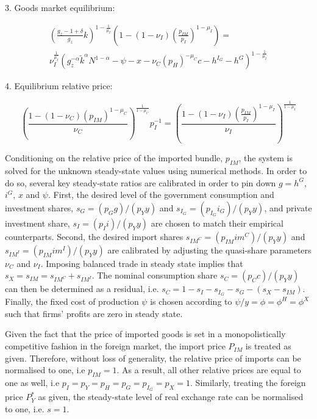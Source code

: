 \documentclass[a4paper,11pt]{article}
\numberwithin{equation}{section}
\begin{document}
	3. Goods market equilibrium:
	
	\begin{multline} \label{ss_goods_final}
	\left(\frac{g_z-1+\delta}{g_z}k\right)^{1-\frac{1}{\mu_I}}\left(1-\left(1-\nu_I\right)\left(\frac{p_{IM}}{p_I}\right)^{1-\mu_I}\right)=\\
	\nu_I^{\frac{1}{\mu_I}}\left(g_z^{-\alpha}\tilde{k}^{\alpha}N^{1-\alpha}-\psi-x-\nu_C\left(p_H\right)^{-\mu_C}c-h^{I_G}-h^G\right)^{1-\frac{1}{\mu_I}}
	\end{multline}
	
	4. Equilibrium relative price:
	
	\begin{equation}
	\left(\frac{1-\left(1-\nu_C\right)\left(p_{IM}\right)^{1-\mu_C}}{\nu_C}\right)^{\frac{1}{1-\mu_C}}p_I^{-1}=\left(\frac{1-\left(1-\nu_I\right)\left(\frac{p_{IM}}{p_I}\right)^{1-\mu_I}}{\nu_I}\right)^{\frac{1}{1-\mu_I}}
	\end{equation}
	
	Conditioning on the relative price of the imported bundle, $p_{IM}$, the system is solved for the unknown steady-state values using numerical methods. In order to do so, several key steady-state ratios are calibrated in order to pin down $g=h^G$, $i^G$, $x$ and $\psi$. First, the desired level of the government consumption and investment shares, $s_G=(p_Gg)/(p_Yy)$ and $s_{I_G}=(p_{I_G}i_G)/(p_Yy)$, and private investment share, $s_I=(p_Ii)/(p_Yy)$ are chosen to match their empirical counterparts. Second, the desired import shares $s_{IM^C}=(p_{IM}im^C)/(p_Yy)$ and $s_{IM^I}=(p_{IM}im^I)/(p_Yy)$ are calibrated by adjusting the quasi-share parameters $\nu_C$ and $\nu_I$. Imposing balanced trade in steady state implies that $s_X=s_{IM}=s_{IM^C}+s_{IM^I}$. The nominal consumption share $s_C=(p_Cc)/(p_Yy)$ can then be determined as a residual, i.e. $s_C=1-s_I-s_{I_G}-s_G-(s_X-s_{IM})$. Finally, the fixed cost of production $\psi$ is chosen according to $\psi/y=\phi=\phi^H=\phi^X$ such that firms' profits are zero in steady state. 
	
	Given the fact that the price of imported goods is set in a monopolistically competitive fashion in the foreign market, the import price $P_{IM}$ is treated as given. Therefore, without loss of generality, the relative price of imports can be normalised to one, i.e $p_{IM} = 1$. As a result, all other relative prices are equal to one as well, i.e $p_I = p_Y = p_H = p_G = p_{I_G} = p_X = 1$. Similarly, treating the foreign price $P_Y^*$ as given, the steady-state level of real exchange rate can be normalised to one, i.e. $s=1$. 
	
\end{document}

